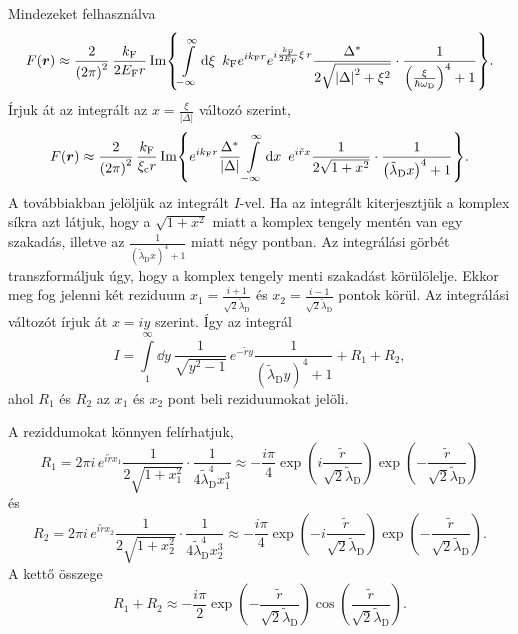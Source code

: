 \documentclass[a4paper,12pt,titlepage]{article}
\newcommand{\RR}{{\vb*{r}}}
\begin{document}
Mindezeket felhasználva
\begin{equation}
	F(\RR) \approx \frac{2}{\left( 2 \pi \right)^2} \, \frac{k_\text{F}}{2 E_\text{F} r} \Im{ \int\limits_{-\infty}^\infty \dd{\xi} ~ k_\text{F} e^{i k_\text{F} r} e^{i \frac{k_\text{F}}{2 E_\text{F}} \xi \, r} \frac{\Delta^*}{2 \sqrt{\left| \Delta \right|^2 + \xi^2}} \cdot \frac{1}{\left( \frac{\xi}{\hbar \omega_\text{D}} \right)^4 + 1} }.
\end{equation}
Írjuk át az integrált az $x = \frac{\xi}{\left| \Delta \right|}$ változó szerint,
\begin{equation} \label{f-def}
	F(\RR) \approx \frac{2}{\left( 2 \pi \right)^2} \, \frac{k_\text{F}}{\xi_\text{c} r} \Im{ e^{i k_\text{F} r} \frac{\Delta^*}{\left| \Delta \right|} \int\limits_{-\infty}^\infty \dd{x} ~ e^{i \tilde{r} x} \frac{1}{2 \sqrt{1 + x^2}} \cdot \frac{1}{\left( \tilde{\lambda}_\text{D} x \right)^4 + 1} }.
\end{equation}
A továbbiakban jelöljük az integrált $I$-vel.  Ha az integrált kiterjesztjük a komplex síkra azt látjuk, hogy a $\sqrt{1 + x^2}$ miatt a komplex tengely mentén van egy szakadás, illetve az $\frac{1}{\left( \tilde{\lambda}_\text{D} x \right)^4 + 1}$ miatt négy pontban.  Az integrálási görbét transzformáljuk úgy, hogy a komplex tengely menti szakadást körülölelje.  Ekkor meg fog jelenni két reziduum $x_1 = \frac{i + 1}{\sqrt{2} \tilde{\lambda}_\text{D}}$ és $x_2 = \frac{i - 1}{\sqrt{2} \tilde{\lambda}_\text{D}}$ pontok körül.  Az integrálási változót írjuk át $x = i y$ szerint.  Így az integrál
\begin{equation}
	I = \int\limits_1^\infty \dd{y} ~ \frac{1}{\sqrt{y^2 - 1}} \, e^{-\tilde{r} y} \frac{1}{\left( \tilde{\lambda}_\text{D} y \right)^4 + 1} + R_1 + R_2,
\end{equation}
ahol $R_1$ és $R_2$ az $x_1$ és $x_2$ pont beli reziduumokat jelöli.

A reziddumokat könnyen felírhatjuk,
\begin{equation}
	R_1 = 2 \pi i \, e^{i \tilde{r} x_1} \frac{1}{2 \sqrt{1 + x_1^2}} \cdot \frac{1}{4 \tilde{\lambda}_\text{D}^4 x_1^3} \approx -\frac{i \pi}{4} \exp(i \frac{\tilde{r}}{\sqrt{2} \tilde{\lambda}_\text{D}}) \exp(-\frac{\tilde{r}}{\sqrt{2} \tilde{\lambda}_\text{D}})
\end{equation}
és
\begin{equation}
	R_2 = 2 \pi i \, e^{i \tilde{r} x_2} \frac{1}{2 \sqrt{1 + x_2^2}} \cdot \frac{1}{4 \tilde{\lambda}_\text{D}^4 x_2^3} \approx -\frac{i \pi}{4} \exp(-i \frac{\tilde{r}}{\sqrt{2} \tilde{\lambda}_\text{D}}) \exp(-\frac{\tilde{r}}{\sqrt{2} \tilde{\lambda}_\text{D}}).
\end{equation}
A kettő összege
\begin{equation}
	R_1 + R_2 \approx -\frac{i \pi}{2} \exp(-\frac{\tilde{r}}{\sqrt{2} \tilde{\lambda}_\text{D}}) \cos(\frac{\tilde{r}}{\sqrt{2} \tilde{\lambda}_\text{D}}).
\end{equation}
\end{document}
